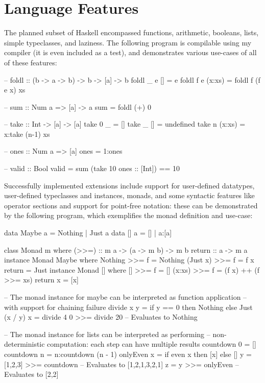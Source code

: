 \documentclass[dissertation.tex]{subfiles}
\begin{document}
\section{Language Features}
{
    The planned subset of Haskell encompassed functions, arithmetic, booleans, lists, simple typeclasses, and laziness. The following program is compilable using my compiler (it is even included as a test), and demonstrates various use-cases of all of these features:

    \begin{haskellfigure}
    -- foldl :: (b -> a -> b) -> b -> [a] -> b
    foldl _ e [] = e
    foldl f e (x:xs) = foldl f (f e x) xs

    -- sum :: Num a => [a] -> a
    sum = foldl (+) 0

    -- take :: Int -> [a] -> [a]
    take 0 _ = []
    take _ [] = undefined
    take n (x:xs) = x:take (n-1) xs

    -- ones :: Num a => [a]
    ones = 1:ones

    -- valid :: Bool
    valid = sum (take 10 ones :: [Int]) == 10
    \end{haskellfigure}

    Successfully implemented extensions include support for user-defined datatypes, user-defined typeclasses and instances, monads, and some syntactic features like operator sections and support for point-free notation: these can be demonstrated by the following program, which exemplifies the monad definition and use-case:

    \begin{haskellfigure}
    data Maybe a = Nothing | Just a
    data [] a = [] | a:[a]
    
    class Monad m where
        (>>=) :: m a -> (a -> m b) -> m b
        return :: a -> m a
    instance Monad Maybe where
        Nothing >>= f = Nothing
        (Just x) >>= f = f x
        return = Just
    instance Monad [] where
        [] >>= f = []
        (x:xs) >>= f = (f x) ++ (f >>= xs)
        return x = [x]

    -- The monad instance for maybe can be interpreted as function application
    -- with support for chaining failure
    divide x y = if y == 0 then Nothing else Just (x / y)
    x = divide 4 0 >>= divide 20 -- Evaluates to Nothing

    -- The monad instance for lists can be interpreted as performing
    -- non-deterministic computation: each step can have multiple results
    countdown 0 = []
    countdown n = n:countdown (n - 1)
    onlyEven x = if even x then [x] else []
    y = [1,2,3] >>= countdown -- Evaluates to [1,2,1,3,2,1]
    z = y >>= onlyEven -- Evaluates to [2,2]
    \end{haskellfigure}

}
\end{document}
